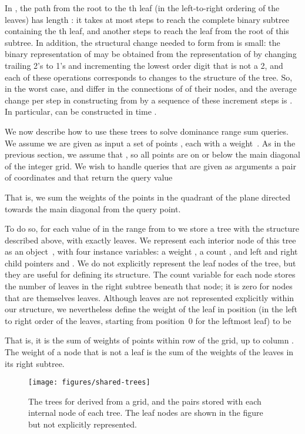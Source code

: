 \documentclass[11pt]{article}
\begin{document}
In , the path from the root to the th leaf (in the left-to-right ordering of the leaves) has length : it takes at most  steps to reach the complete binary subtree containing the th leaf, and another  steps to reach the leaf from the root of this subtree. In addition, the structural change needed to form  from  is small: the binary representation of  may be obtained from the representation of  by changing trailing 2's to 1's and incrementing the lowest order digit that is not a 2, and each of these operations corresponds to  changes to the structure of the tree. So, in the worst case,  and  differ in the connections of  of their nodes, and the average change per step in constructing  from  by a sequence of these increment steps is . In particular,  can be constructed in time .

We now describe how to use these trees to solve dominance range sum queries. We assume we are given as input a set of  points , each with a weight~. As in the previous section, we assume that , so all points are on or below the main diagonal of the  integer grid. We wish to handle queries that are given as arguments a pair of coordinates  and that return the query value

That is, we sum the weights of the points in the quadrant of the plane directed towards the main diagonal from the query point.

To do so, for each value of  in the range from  to  we store a tree  with the structure described above, with exactly  leaves. We represent each interior node of this tree as an object~, with four instance variables: a weight , a count , and left and right child pointers  and . We do not explicitly represent the leaf nodes of the tree, but they are useful for defining its structure. The count variable for each node stores the number of leaves in the right subtree beneath that node; it is zero for nodes that are themselves leaves. Although leaves are not represented explicitly within our structure, we nevertheless define the weight of the leaf in position  (in the left to right order of the leaves, starting from position~0 for the leftmost leaf) to be

That is, it is the sum of weights of points within row  of the  grid, up to column .
The weight of a node that is not a leaf is the sum of the weights of the leaves in its right subtree.

\begin{figure}[t]
\centering\texttt{[image: figures/shared-trees]}
\caption{The trees  for  derived from a  grid, and the pairs  stored with each internal node of each tree. The leaf nodes are shown in the figure but not explicitly represented.}
\label{fig:shared-trees}
\end{figure}
\end{document}
